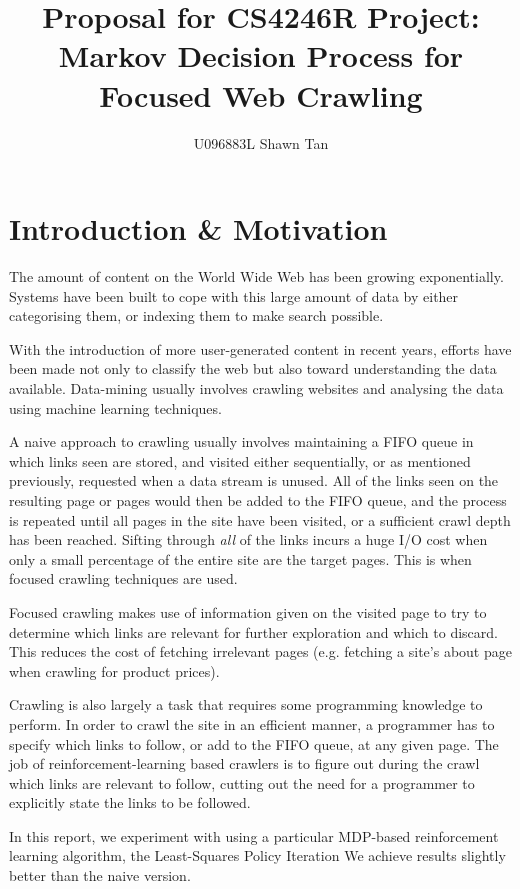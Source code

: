 \documentclass{article}[12 pt]
\title{Proposal for CS4246R Project:\\Markov Decision Process for Focused Web Crawling}
\author{U096883L Shawn Tan}
\begin{document}
\maketitle
\section{Introduction \& Motivation}
The amount of content on the World Wide Web has been growing exponentially. Systems have been built to cope with this large amount of data by either categorising them, or indexing them to make search possible.

With the introduction of more user-generated content in recent years, efforts have been made not only to classify the web but also toward understanding the data available. Data-mining usually involves crawling websites and analysing the data using machine learning techniques.

A naive approach to crawling usually involves maintaining a FIFO queue in which links seen are stored, and visited either sequentially, or as mentioned previously, requested when a data stream is unused. All of the links seen on the resulting page or pages would then be added to the FIFO queue, and the process is repeated until all pages in the site have been visited, or a sufficient crawl depth has been reached. Sifting through \emph{all} of the links incurs a huge I/O cost when only a small percentage of the entire site are the target pages. This is when focused crawling techniques are used.

Focused crawling makes use of information given on the visited page to try to determine which links are relevant for further exploration and which to discard. This reduces the cost of fetching irrelevant pages (e.g. fetching a site's about page when crawling for product prices).

Crawling is also largely a task that requires some programming knowledge to perform. In order to crawl the site in an efficient manner, a programmer has to specify which links to follow, or add to the FIFO queue, at any given page. The job of reinforcement-learning based crawlers is to figure out during the crawl which links are relevant to follow, cutting out the need for a programmer to explicitly state the links to be followed.

In this report, we experiment with using a particular MDP-based reinforcement learning algorithm, the Least-Squares Policy Iteration %
We achieve results slightly better than the naive version.
\end{document}
